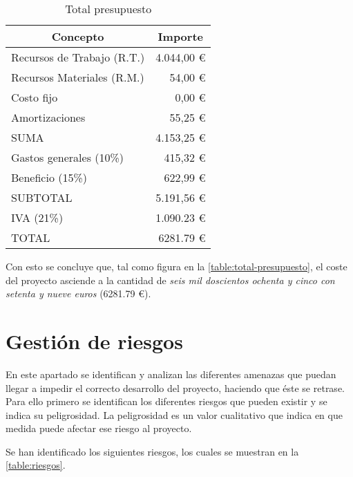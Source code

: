\begin{table}[H]
	\centering
	\begin{tabular}{ |l|r| } 
		\hline
		\multicolumn{1}{|c|}{Concepto} & 
			\multicolumn{1}{|c|}{Importe} \\
		\hline
		Recursos de Trabajo (R.T.)	& 4.044,00 \euro	\\
		Recursos Materiales (R.M.)	& 54,00 \euro		\\
		Costo fijo					& 0,00 \euro		\\
		Amortizaciones				& 55,25 \euro		\\
		\hline
		SUMA						& 4.153,25 \euro	\\
		\hline
		Gastos generales (10\%)		& 415,32 \euro		\\
		Beneficio (15\%)			& 622,99 \euro		\\
		\hline
		SUBTOTAL					& 5.191,56 \euro	\\
		IVA (21\%)					& 1.090.23 \euro	\\
		\hline
		TOTAL						& 6281.79 \euro		\\
		\hline
	\end{tabular}
	\caption{Total presupuesto}
	\label{table:total-presupuesto}
\end{table}

Con esto se concluye que, tal como figura en la \autoref{table:total-presupuesto}, el coste del proyecto asciende a la cantidad de \textit{seis mil doscientos ochenta y cinco con setenta y nueve euros} (6281.79 \euro).


\section{Gestión de riesgos}

En este apartado se identifican y analizan las diferentes amenazas que puedan llegar a impedir el correcto desarrollo del proyecto, haciendo que éste se retrase. Para ello primero se identifican los diferentes riesgos que pueden existir y se indica su peligrosidad. La peligrosidad es un valor cualitativo que indica en que medida puede afectar ese riesgo al proyecto.

Se han identificado los siguientes riesgos, los cuales se muestran en la \autoref{table:riesgos}.

